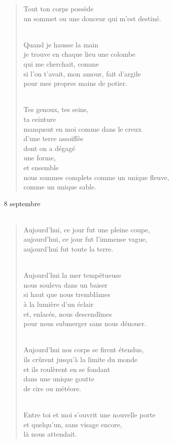 \documentclass[11pt,a4paper]{book}
\begin{document}
\begin{verse}
Tout ton corps possède \\
un sommet ou une douceur qui m'est destiné. \\ \

Quand je hausse la main \\
je trouve en chaque lieu une colombe \\
qui me cherchait, comme \\
si l'on t'avait, mon amour, fait d'argile \\
pour mes propres mains de potier. \\ \

Tes genoux, tes seins, \\
ta ceinture \\
manquent en moi comme dans le creux \\
d'une terre assoiffée \\
dont on a dégagé \\
une forme, \\
et ensemble \\
nous sommes complets comme un unique fleuve, \\
comme un unique sable.
\end{verse}

\newpage

{\huge 8 septembre} \\ \\

\begin{verse}
Aujourd'hui, ce jour fut une pleine coupe, \\
aujourd'hui, ce jour fut l'immense vague, \\
aujourd'hui fut toute la terre. \\ \

Aujourd'hui la mer tempétueuse \\
nous souleva dans un baiser \\
si haut que nous tremblâmes \\
à la lumière d'un éclair \\
et, enlacés, nous descendîmes \\
pour nous submerger sans nous dénouer. \\ \

Aujourd'hui nos corps se firent étendus, \\
ils crûrent jusqu'à la limite du monde \\
et ils roulèrent en se fondant \\
dans une unique goutte \\
de cire ou météore. \\ \

Entre toi et moi s'ouvrit une nouvelle porte \\
et quelqu'un, sans visage encore, \\
là nous attendait.
\end{verse}
\end{document}
